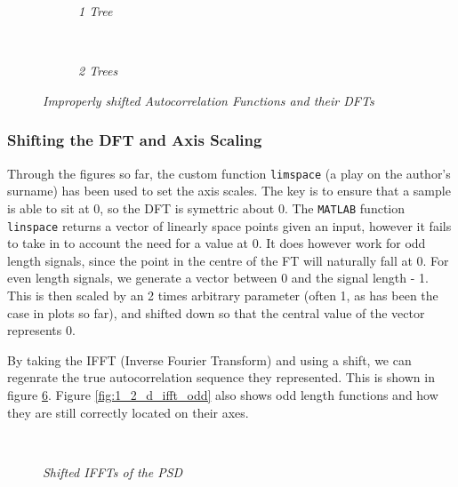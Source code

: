 \documentclass[./main.tex]{subfiles}
\begin{document}
\begin{figure}[h]
	\centering
	\begin{subfigure}[b]{0.49\textwidth}
		\resizebox{\textwidth}{!}{}
		\caption{\textit{1 Tree}}
		\label{fig:1_2_c_10}
	\end{subfigure}
	~ %
	\begin{subfigure}[b]{0.49\textwidth}
		\resizebox{\textwidth}{!}{}
		\caption{\textit{2 Trees}}
		\label{fig:1_2_c_128}
	\end{subfigure}
	\label{fig:1_2_c}
	\caption{\textit{Improperly shifted Autocorrelation Functions and their DFTs}}
\end{figure}


\subsubsection{Shifting the DFT and Axis Scaling}

Through the figures so far, the custom function \texttt{limspace} (a play on the author's surname) has been used to set the axis scales. The key is to ensure that a sample is able to sit at 0, so the DFT is symettric about 0. The \texttt{MATLAB} function \texttt{linspace} returns a vector of linearly space points given an input, however it fails to take in to account the need for a value at 0. It does however work for odd length signals, since the point in the centre of the FT will naturally fall at 0. For even length signals, we generate a vector between 0 and the signal length - 1. This is then scaled by an 2 times arbitrary parameter (often 1, as has been the case in plots so far), and shifted down so that the central value of the vector represents 0.

By taking the IFFT (Inverse Fourier Transform) and using a shift, we can regenrate the true autocorrelation sequence they represented. This is shown in figure \ref{fig:1_2_d_ifft}. Figure \ref{fig:1_2_d_ifft_odd} also shows odd length functions and how they are still correctly located on their axes.

\begin{figure}[h]
	\centering
	\begin{subfigure}[b]{0.49\textwidth}
		\resizebox{\textwidth}{!}{}
		\label{fig:1_2_d_ifft_10}
	\end{subfigure}
	~ %
	\begin{subfigure}[b]{0.49\textwidth}
		\resizebox{\textwidth}{!}{}
		\label{fig:1_2_d_ifft_128}
	\end{subfigure}
	\label{fig:1_2_d_ifft}
	\caption{\textit{Shifted IFFTs of the PSD}}
\end{figure}
\end{document}
